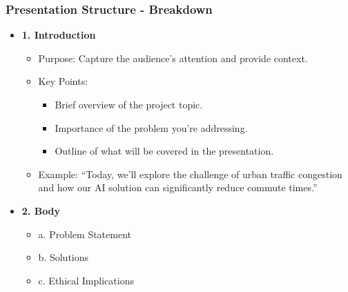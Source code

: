 \documentclass[aspectratio=169]{beamer}
\begin{document}
\begin{frame}[fragile]
    \frametitle{Presentation Structure - Breakdown}
    \begin{itemize}
        \item \textbf{1. Introduction}
            \begin{itemize}
                \item Purpose: Capture the audience's attention and provide context.
                \item Key Points:
                    \begin{itemize}
                        \item Brief overview of the project topic.
                        \item Importance of the problem you're addressing.
                        \item Outline of what will be covered in the presentation.
                    \end{itemize}
                \item Example: ``Today, we'll explore the challenge of urban traffic congestion and how our AI solution can significantly reduce commute times.''
            \end{itemize}
        
        \item \textbf{2. Body}
            \begin{itemize}
                \item a. Problem Statement
                \item b. Solutions
                \item c. Ethical Implications
            \end{itemize}
    \end{itemize}
\end{frame}
\end{document}

